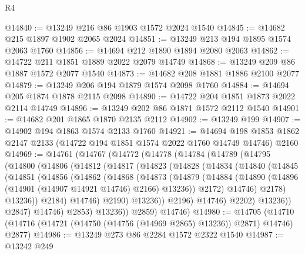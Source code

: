 \begin{lexlean}{R4}
\begin{coremodule}
@14840 := @13249 @216 @86 @1903 @1572 @2024 @1540
@14845 := @14682 @215 @1897 @1902 @2065 @2024
@14851 := @13249 @213 @194 @1895 @1574 @2063 @1760
@14856 := @14694 @212 @1890 @1894 @2080 @2063
@14862 := @14722 @211 @1851 @1889 @2022 @2079 @14749
@14868 := @13249 @209 @86 @1887 @1572 @2077 @1540
@14873 := @14682 @208 @1881 @1886 @2100 @2077
@14879 := @13249 @206 @194 @1879 @1574 @2098 @1760
@14884 := @14694 @205 @1874 @1878 @2115 @2098
@14890 := @14722 @204 @1851 @1873 @2022 @2114 @14749
@14896 := @13249 @202 @86 @1871 @1572 @2112 @1540
@14901 := @14682 @201 @1865 @1870 @2135 @2112
@14902 := @13249 @199
@14907 := @14902 @194 @1863 @1574 @2133 @1760
@14921 := @14694
    @198
    @1853
    @1862
    @2147
    @2133
    (@14722 @194 @1851 @1574 @2022 @1760 @14749 @14746)
    @2160
@14969 := @14761
    (@14767
      (@14772
        (@14778
          (@14784
            (@14789
              (@14795
                (@14800
                  (@14806
                    (@14812
                      (@14817
                        (@14823
                          (@14828
                            (@14834
                              (@14840
                                (@14845
                                  (@14851
                                    (@14856
                                      (@14862
                                        (@14868
                                          (@14873
                                            (@14879
                                              (@14884
                                                (@14890
                                                  (@14896
                                                    (@14901 (@14907 @14921 @14746) @2166)
                                                    @13236))
                                                @2172)
                                              @14746)
                                            @2178)
                                          @13236))
                                      @2184)
                                    @14746)
                                  @2190)
                                @13236))
                            @2196)
                          @14746)
                        @2202)
                      @13236))
                  @2847)
                @14746)
              @2853)
            @13236))
        @2859)
      @14746)
@14980 := @14705
    (@14710 (@14716 (@14721 (@14750 (@14756 (@14969 @2865) @13236)) @2871) @14746) @2877)
@14986 := @13249 @273 @86 @2284 @1572 @2322 @1540
@14987 := @13242 @249

\end{coremodule}
\end{lexlean}
